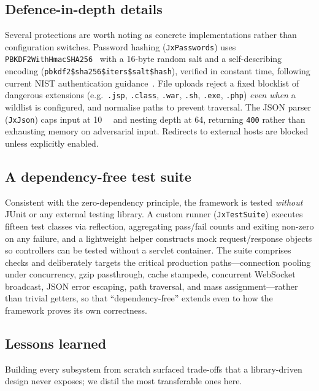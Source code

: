 \subsection{Defence-in-depth details}

Several protections are worth noting as concrete implementations rather
than configuration switches. Password hashing (\texttt{JxPasswords})
uses \texttt{PBKDF2WithHmacSHA256}~\cite{rfc8018} with a 16-byte random
salt and a self-describing encoding
(\texttt{pbkdf2\$sha256\$iters\$salt\$hash}), verified in constant time,
following current NIST authentication guidance~\cite{nist80063b}. File uploads reject a fixed blocklist of
dangerous extensions (e.g.\ \texttt{.jsp}, \texttt{.class},
\texttt{.war}, \texttt{.sh}, \texttt{.exe}, \texttt{.php}) \emph{even
when} a wildlist is configured, and normalise paths to prevent
traversal. The JSON parser (\texttt{JxJson}) caps input at
\SI{10}{\mega\byte} and nesting depth at 64, returning \texttt{400}
rather than exhausting memory on adversarial input. Redirects to
external hosts are blocked unless explicitly enabled.

\subsection{A dependency-free test suite}

Consistent with the zero-dependency principle, the framework is tested
\emph{without} JUnit or any external testing library. A custom runner
(\texttt{JxTestSuite}) executes fifteen test classes via reflection,
aggregating pass/fail counts and exiting non-zero on any failure, and a
lightweight helper constructs mock request/response objects so
controllers can be tested without a servlet container. The suite
comprises \NTESTS{} checks and deliberately targets the critical
production paths---connection pooling under concurrency, gzip
passthrough, cache stampede, concurrent WebSocket broadcast, JSON error
escaping, path traversal, and mass assignment---rather than trivial
getters, so that ``dependency-free'' extends even to how the framework
proves its own correctness.

\subsection{Lessons learned}
\label{sec:lessons}

Building every subsystem from scratch surfaced trade-offs that a
library-driven design never exposes; we distil the most transferable
ones here.

